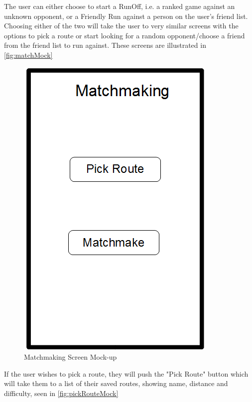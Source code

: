 The user can either choose to start a RunOff, i.e. a ranked game against an unknown opponent, or a Friendly Run against a person on the user's friend list. Choosing either of the two will take the user to very similar screens with the options to pick a route or start looking for a random opponent/choose a friend from the friend list to run against. These screens are illustrated in \autoref{fig:matchMock}

\begin{figure}[ht]
\begin{center}
 \caption{Matchmaking Screen Mock-up}
 \label{fig:matchMock}
 \includegraphics[scale=0.4]{img/matchMock.png}
\end{center}
\end{figure}

If the user wishes to pick a route, they will push the "Pick Route" button which will take them to a list of their saved routes, showing name, distance and difficulty, seen in \autoref{fig:pickRouteMock}

